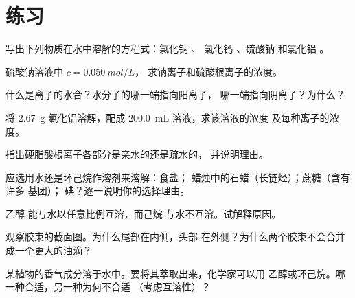 \section{练习}


\begin{exercise}[$\star$]\label{exo:g11:dissolution:1}
写出下列物质在水中溶解的方程式：氯化钠 、
氯化钙 、硫酸钠  和氯化铝
。
\end{exercise}

\begin{exercise}[$\star$]\label{exo:g11:dissolution:2}
硫酸钠溶液中 $c = \qty{0.050}{mol/L}$，
求钠离子和硫酸根离子的浓度。
\end{exercise}

\begin{exercise}[$\star$]\label{exo:g11:dissolution:3}
什么是离子的水合？水分子的哪一端指向阳离子，
哪一端指向阴离子？为什么？
\end{exercise}

\begin{exercise}[$\star$]\label{exo:g11:dissolution:4}
将 \qty{2.67}{g} 氯化铝溶解，配成
\qty{200.0}{mL} 溶液，求该溶液的浓度
及每种离子的浓度。
\end{exercise}

\begin{exercise}[$\star$]\label{exo:g11:dissolution:5}
指出硬脂酸根离子各部分是亲水的还是疏水的，
并说明理由。
\end{exercise}

\begin{exercise}[$\star\star$]\label{exo:g11:dissolution:6}
应选用水还是环己烷作溶剂来溶解：食盐；
蜡烛中的石蜡（长链烃）；蔗糖（含有许多  基团）；
碘？逐一说明你的选择理由。
\end{exercise}

\begin{exercise}[$\star\star$]\label{exo:g11:dissolution:7}
乙醇  能与水以任意比例互溶，而己烷
 与水不互溶。试解释原因。
\end{exercise}

\begin{exercise}[$\star\star$]\label{exo:g11:dissolution:8}
观察胶束的截面图。为什么尾部在内侧，头部
在外侧？为什么两个胶束不会合并成一个更大的油滴？
\end{exercise}

\begin{exercise}[$\star\star$]\label{exo:g11:dissolution:9}
某植物的香气成分溶于水中。要将其萃取出来，化学家可以用
乙醇或环己烷。哪一种合适，另一种为何不合适
（考虑互溶性）？
\end{exercise}

